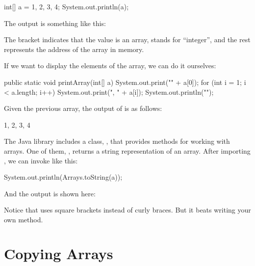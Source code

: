 \begin{code}
int[] a = {1, 2, 3, 4};
System.out.println(a);
\end{code}

The output is something like this:

\begin{stdout}
[I@bf3f7e0
\end{stdout}

The bracket indicates that the value is an array,  stands for ``integer'', and the rest represents the address of the array in memory.

If we want to display the elements of the array, we can do it ourselves:

\begin{code}
public static void printArray(int[] a) {
    System.out.print("{" + a[0]);
    for (int i = 1; i < a.length; i++) {
        System.out.print(", " + a[i]);
    }
    System.out.println("}");
}
\end{code}

Given the previous array, the output of  is as follows:

\begin{stdout}
{1, 2, 3, 4}
\end{stdout}


The Java library includes a class, , that provides methods for working with arrays.
One of them, , returns a string representation of an array.
After importing , we can invoke  like this:

\begin{code}
System.out.println(Arrays.toString(a));
\end{code}

And the output is shown here:

\begin{stdout}
[1, 2, 3, 4]
\end{stdout}

Notice that  uses square brackets instead of curly braces.
But it beats writing your own  method.


\section{Copying Arrays}


